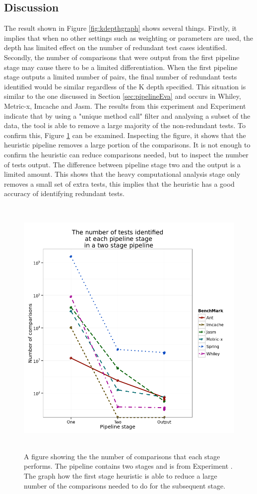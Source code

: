 \subsection{Discussion}
The result shown in Figure \ref{fig:kdepthgraph} shows several things. Firstly, it implies that when no other settings such as weighting or parameters are used, the depth has limited effect on the number of redundant test cases identified. Secondly, the number of comparisons that were output from the first pipeline stage may cause there to be a limited differentiation. When the first pipeline stage outputs a limited number of pairs, the final number of redundant tests identified would be similar regardless of the K depth specified. This situation is similar to the one discussed in Section \ref{sec:pipelineEva} and occurs in Whiley, Metric-x, Imcache and Jasm. The results from this experiment and Experiment  indicate that by using a "unique method call" filter and analysing a subset of the data, the tool is able to remove a large majority of the non-redundant tests. To confirm this, Figure \ref{fig:stagesinpipeline} can be examined. Inspecting the figure, it shows that the heuristic pipeline removes a large portion of the comparisons. It is not enough to confirm the heuristic can reduce comparisons needed, but to inspect the number of tests output. The difference between pipeline stage two and the output is a limited amount. This shows that the heavy computational analysis stage only removes a small set of extra tests, this implies that the heuristic has a good accuracy of identifying redundant tests.

\begin{figure}[h]
\centering
\includegraphics[width=\textwidth,height=13cm]{stagesinpipeline.png}
\caption{A figure showing the the number of comparisons that each stage performs. The pipeline contains two stages and is from Experiment . The graph how the first stage heuristic is able to reduce a large number of the comparisons needed to do for the subsequent stage.}
\label{fig:stagesinpipeline}
\end{figure}

